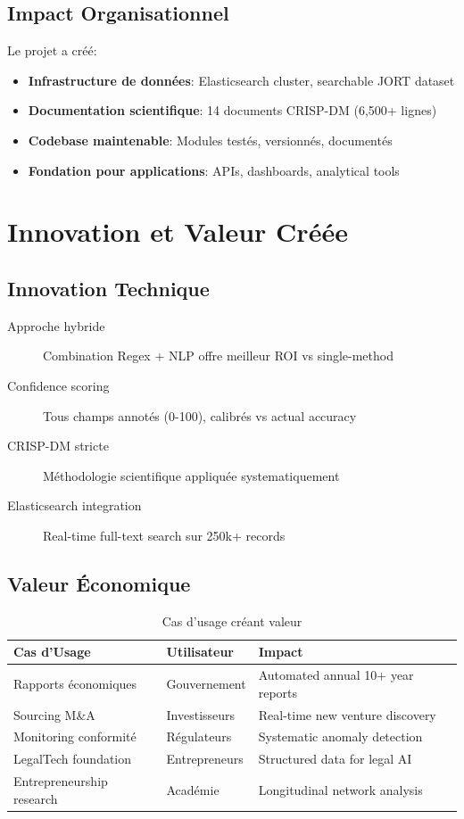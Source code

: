 \documentclass[12pt,a4paper]{report}
\begin{document}
\subsection{Impact Organisationnel}

Le projet a créé:

\begin{itemize}
    \item \textbf{Infrastructure de données}: Elasticsearch cluster, searchable JORT dataset
    \item \textbf{Documentation scientifique}: 14 documents CRISP-DM (6,500+ lignes)
    \item \textbf{Codebase maintenable}: Modules testés, versionnés, documentés
    \item \textbf{Fondation pour applications}: APIs, dashboards, analytical tools
\end{itemize}

\section{Innovation et Valeur Créée}

\subsection{Innovation Technique}

\begin{description}
    \item[Approche hybride] Combination Regex + NLP offre meilleur ROI vs single-method
    \item[Confidence scoring] Tous champs annotés (0-100), calibrés vs actual accuracy
    \item[CRISP-DM stricte] Méthodologie scientifique appliquée systematiquement
    \item[Elasticsearch integration] Real-time full-text search sur 250k+ records
\end{description}

\subsection{Valeur Économique}

\begin{table}[H]
\centering
\begin{tabular}{|l|l|l|}
\hline
\textbf{Cas d'Usage} & \textbf{Utilisateur} & \textbf{Impact} \\
\hline
Rapports économiques & Gouvernement & Automated annual 10+ year reports \\
Sourcing M\&A & Investisseurs & Real-time new venture discovery \\
Monitoring conformité & Régulateurs & Systematic anomaly detection \\
LegalTech foundation & Entrepreneurs & Structured data for legal AI \\
Entrepreneurship research & Académie & Longitudinal network analysis \\
\hline
\end{tabular}
\caption{Cas d'usage créant valeur}
\end{table}
\end{document}
